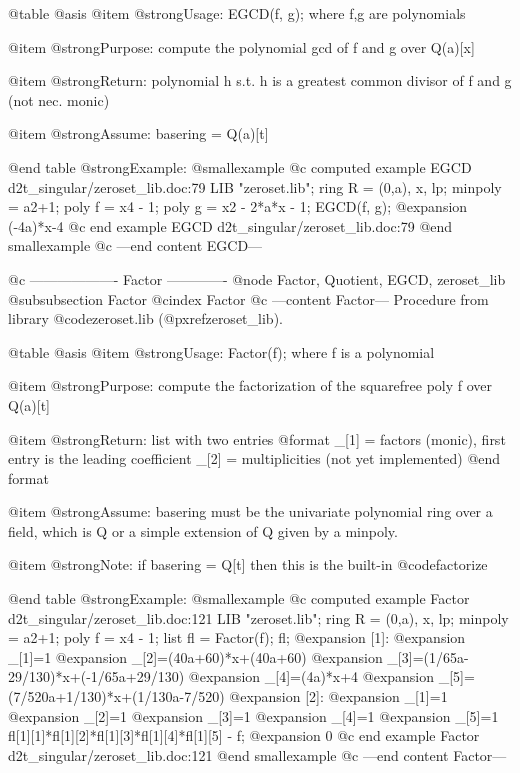 @table @asis
@item @strong{Usage:}
EGCD(f, g); where f,g are polynomials

@item @strong{Purpose:}
compute the polynomial gcd of f and g over Q(a)[x]

@item @strong{Return:}
polynomial h s.t. h is a greatest common divisor of f and g (not nec.
monic)

@item @strong{Assume:}
basering = Q(a)[t]

@end table
@strong{Example:}
@smallexample
@c computed example EGCD d2t_singular/zeroset_lib.doc:79 
LIB "zeroset.lib";
ring R = (0,a), x, lp;
minpoly = a2+1;
poly f =  x4 - 1;
poly g = x2 - 2*a*x - 1;
EGCD(f, g);
@expansion{} (-4a)*x-4
@c end example EGCD d2t_singular/zeroset_lib.doc:79
@end smallexample
@c ---end content EGCD---

@c ------------------- Factor -------------
@node Factor, Quotient, EGCD, zeroset_lib
@subsubsection Factor
@cindex Factor
@c ---content Factor---
Procedure from library @code{zeroset.lib} (@pxref{zeroset_lib}).

@table @asis
@item @strong{Usage:}
Factor(f); where f is a polynomial

@item @strong{Purpose:}
compute the factorization of the squarefree poly f over Q(a)[t]

@item @strong{Return:}
list with two entries
  @format
  _[1] = factors (monic), first entry is the leading coefficient
  _[2] = multiplicities (not yet implemented)
  @end format

@item @strong{Assume:}
basering must be the univariate polynomial ring over a field, which
is Q or a simple extension of Q given by a minpoly.

@item @strong{Note:}
if basering = Q[t] then this is the built-in @code{factorize}

@end table
@strong{Example:}
@smallexample
@c computed example Factor d2t_singular/zeroset_lib.doc:121 
LIB "zeroset.lib";
ring R = (0,a), x, lp;
minpoly = a2+1;
poly f =  x4 - 1;
list fl = Factor(f);
fl;
@expansion{} [1]:
@expansion{}    _[1]=1
@expansion{}    _[2]=(40a+60)*x+(40a+60)
@expansion{}    _[3]=(1/65a-29/130)*x+(-1/65a+29/130)
@expansion{}    _[4]=(4a)*x+4
@expansion{}    _[5]=(7/520a+1/130)*x+(1/130a-7/520)
@expansion{} [2]:
@expansion{}    _[1]=1
@expansion{}    _[2]=1
@expansion{}    _[3]=1
@expansion{}    _[4]=1
@expansion{}    _[5]=1
fl[1][1]*fl[1][2]*fl[1][3]*fl[1][4]*fl[1][5] - f;
@expansion{} 0
@c end example Factor d2t_singular/zeroset_lib.doc:121
@end smallexample
@c ---end content Factor---

